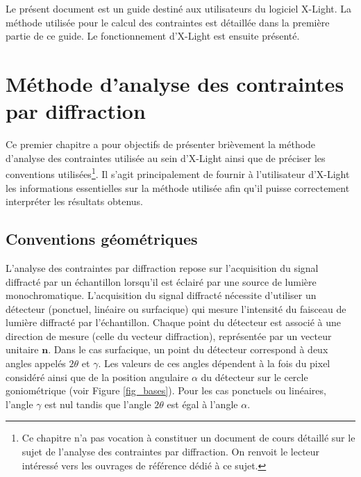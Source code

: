 \documentclass[french,a4paper]{report}
\begin{document}
Le présent document est un guide destiné aux utilisateurs du logiciel X-Light. La méthode utilisée pour le calcul des contraintes est détaillée dans la première partie de ce guide. Le fonctionnement d'X-Light est ensuite présenté.

\chapter{Méthode d'analyse des contraintes par diffraction}

Ce premier chapitre a pour objectifs de présenter brièvement la méthode d'analyse des contraintes utilisée au sein d'X-Light ainsi que de préciser les conventions utilisées\footnote{Ce chapitre n'a pas vocation à constituer un document de cours détaillé sur le sujet de l'analyse des contraintes par diffraction. On renvoit le lecteur intéressé vers les ouvrages de référence dédié à ce sujet.}. Il s'agit principalement de fournir à l'utilisateur d'X-Light les informations essentielles sur la méthode utilisée afin qu'il puisse correctement interpréter les résultats obtenus.


\section{Conventions géométriques}

L'analyse des contraintes par diffraction repose sur l'acquisition du signal diffracté par un échantillon lorsqu'il est éclairé par une source de lumière monochromatique. L'acquisition du signal diffracté nécessite d'utiliser un détecteur (ponctuel, linéaire ou surfacique) qui mesure l'intensité du faisceau de lumière diffracté par l'échantillon. Chaque point du détecteur est associé à une direction de mesure (celle du vecteur diffraction), représentée par un vecteur unitaire $\boldsymbol n$. Dans le cas surfacique, un point du détecteur correspond à deux angles appelés $2 \theta$ et $\gamma$. Les valeurs de ces angles dépendent à la fois du pixel considéré ainsi que de la position angulaire $\alpha$ du détecteur sur le cercle goniométrique (voir Figure \ref{fig_bases}). Pour les cas ponctuels ou linéaires, l'angle $\gamma$ est nul tandis que l'angle $2 \theta$ est égal à l'angle $\alpha$.
\end{document}
